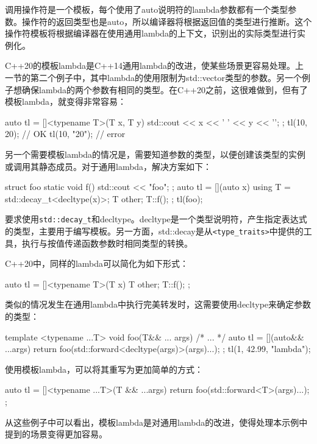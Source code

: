 调用操作符是一个模板，每个使用了auto说明符的lambda参数都有一个类型参数。操作符的返回类型也是auto，所以编译器将根据返回值的类型进行推断。这个操作符模板将根据编译器在使用通用lambda的上下文，识别出的实际类型进行实例化。

C++20的模板lambda是C++14通用lambda的改进，使某些场景更容易处理。上一节的第二个例子中，其中lambda的使用限制为std::vector类型的参数。另一个例子想确保lambda的两个参数有相同的类型。在C++20之前，这很难做到，但有了模板lambda，就变得非常容易：

\begin{cpp}
auto tl = []<typename T>(T x, T y)
{
    std::cout << x << ' ' << y << '\n';
};
tl(10, 20);   // OK
tl(10, "20"); // error
\end{cpp}

另一个需要模板lambda的情况是，需要知道参数的类型，以便创建该类型的实例或调用其静态成员。对于通用lambda，解决方案如下：

\begin{cpp}
struct foo
{
    static void f() { std::cout << "foo\n"; }
};
auto tl = [](auto x)
{
    using T = std::decay_t<decltype(x)>;
    T other;
    T::f();
};
tl(foo{});
\end{cpp}

要求使用\verb|std::decay_t|和decltype。decltype是一个类型说明符，产生指定表达式的类型，主要用于编写模板。另一方面，std::decay是从\verb|<type_traits>|中提供的工具，执行与按值传递函数参数时相同类型的转换。

C++20中，同样的lambda可以简化为如下形式：

\begin{cpp}
auto tl = []<typename T>(T x)
{
    T other;
    T::f();
};
\end{cpp}

类似的情况发生在通用lambda中执行完美转发时，这需要使用decltype来确定参数的类型：

\begin{cpp}
template <typename ...T>
void foo(T&& ... args)
{ /* ... */ }
auto tl = [](auto&& ...args)
{
    return foo(std::forward<decltype(args)>(args)...);
};
tl(1, 42.99, "lambda");
\end{cpp}

使用模板lambda，可以将其重写为更加简单的方式：

\begin{cpp}
auto tl = []<typename ...T>(T && ...args)
{
    return foo(std::forward<T>(args)...);
};
\end{cpp}

从这些例子中可以看出，模板lambda是对通用lambda的改进，使得处理本示例中提到的场景变得更加容易。







